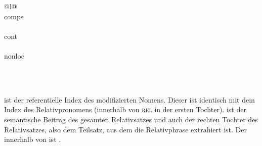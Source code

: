 \begin{schema}[Relativsatzschema]
{{{\begin{tabular}{@{}l@{}}
{{{{                                                                                } \\
                                                               comps \liste{} \\
                                                                     } \\
                                                            cont  \\
                                                          } \\
                                                 nonloc  \\
                                               } \\
                            \end{tabular}
                         } \\
}}
\end{schema}
 ist der referentielle Index des modifizierten Nomens. Dieser ist identisch mit dem Index
des Relativpronomens (innerhalb von \textsc{rel} in der ersten Tochter).  ist der
semantische Beitrag des gesamten Relativsatzes und auch der rechten
Tochter des Relativsatzes, also dem Teilsatz, aus dem die Relativphrase extrahiert ist. Der \ltopw
innerhalb von  ist . 

